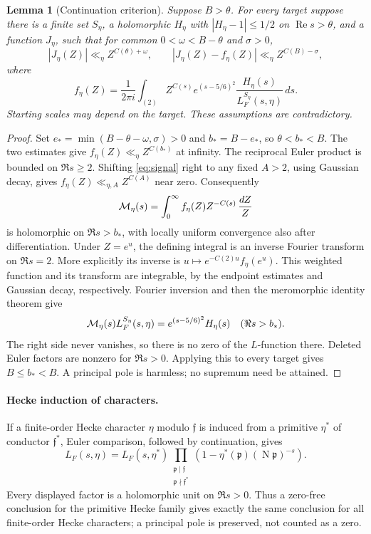 \documentclass[12pt]{article}
\newtheorem{lemma}[theorem]{Lemma}
\newcommand{\Rea}{\operatorname{Re}}
\newcommand{\N}{\operatorname{N}}
\begin{document}
\begin{lemma}[Continuation criterion]\label{lem:criterion}
Suppose \(B>\theta\).  For every target suppose there is a
finite set \(S_\eta\), a holomorphic \(H_\eta\) with
\(|H_\eta-1|\le1/2\) on \(\Rea s>\theta\), and a function
\(J_\eta\), such that for common \(0<\omega<B-\theta\)
and \(\sigma>0\),
\[
 |J_\eta(Z)|\ll_\eta Z^{C(\theta)+\omega},\qquad
 |J_\eta(Z)-f_\eta(Z)|\ll_\eta Z^{C(B)-\sigma},
\]
where
\begin{equation}\label{eq:signal}
 f_\eta(Z)=\frac1{2\pi i}\int_{(2)}
 Z^{C(s)}e^{(s-5/6)^2}
 \frac{H_\eta(s)}{L_F^{S_\eta}(s,\eta)}\,ds.
\end{equation}
Starting scales may depend on the target.  These assumptions are
contradictory.
\end{lemma}
\begin{proof}
Set \(e_*=\min(B-\theta-\omega,\sigma)>0\) and
\(b_*=B-e_*\), so \(\theta<b_*<B\).
The two estimates give \(f_\eta(Z)\ll_\eta Z^{C(b_*)}\) at infinity.
The reciprocal Euler product is bounded on \(\Re s\ge2\).
Shifting \eqref{eq:signal} right to any fixed \(A>2\), using
Gaussian decay, gives \(f_\eta(Z)\ll_{\eta,A}Z^{C(A)}\) near zero.
Consequently
\[
 {\cal M}_\eta(s)=\int_0^\infty f_\eta(Z)Z^{-C(s)}\,\frac{dZ}{Z}
\]
is holomorphic on \(\Re s>b_*\), with locally uniform convergence
also after differentiation.  Under \(Z=e^u\), the defining integral
is an inverse Fourier transform on \(\Re s=2\).
More explicitly its inverse is
\(u\mapsto e^{-C(2)u}f_\eta(e^u)\).
This weighted function and its transform are integrable, by
the endpoint estimates and Gaussian decay, respectively.  Fourier inversion
and then the meromorphic identity theorem give
\[
 {\cal M}_\eta(s)L_F^{S_\eta}(s,\eta)
       =e^{(s-5/6)^2}H_\eta(s)\quad(\Re s>b_*).
\]
The right side never vanishes, so there is no zero of the
\(L\)-function there.  Deleted Euler factors are nonzero for
\(\Re s>0\).  Applying this to every target gives \(B\le b_*<B\).
A principal pole is harmless; no supremum need be attained.
\end{proof}

\paragraph{Hecke induction of characters.}
If a finite-order Hecke character \(\eta\) modulo \(\mathfrak f\)
is induced from a primitive \(\eta^*\) of conductor \(\mathfrak f^*\),
Euler comparison, followed by continuation, gives
\[
 L_F(s,\eta)=L_F(s,\eta^*)
 \prod_{\substack{\mathfrak p\mid\mathfrak f\\
                    \mathfrak p\nmid\mathfrak f^*}}
       (1-\eta^*(\mathfrak p)(\N\mathfrak p)^{-s}).
\]
Every displayed factor is a holomorphic unit on \(\Re s>0\).
Thus a zero-free conclusion for the primitive Hecke family gives
exactly the same conclusion for all finite-order Hecke characters;
a principal pole is preserved, not counted as a zero.
\end{document}
